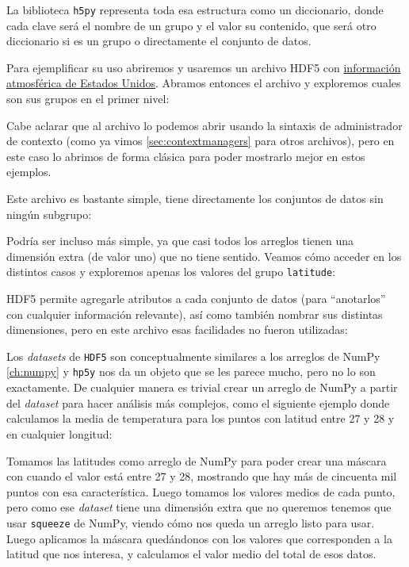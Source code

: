La biblioteca \texttt{h5py} representa toda esa estructura como un diccionario, donde cada clave será el nombre de un grupo y el valor su contenido, que será otro diccionario si es un grupo o directamente el conjunto de datos.

Para ejemplificar su uso abriremos y usaremos un archivo HDF5 con \href{https://data.nrel.gov/submissions/70}{información atmosférica de Estados Unidos}. Abramos entonces el archivo y exploremos cuales son sus grupos en el primer nivel:


Cabe aclarar que al archivo lo podemos abrir usando la sintaxis de administrador de contexto (como ya vimos \ref{sec:contextmanagers} para otros archivos), pero en este caso lo abrimos de forma clásica para poder mostrarlo mejor en estos ejemplos.

Este archivo es bastante simple, tiene directamente los conjuntos de datos sin ningún subgrupo:


Podría ser incluso más simple, ya que casi todos los arreglos tienen una dimensión extra (de valor uno) que no tiene sentido. Veamos cómo acceder en los distintos casos y exploremos apenas los valores del grupo \texttt{latitude}:


HDF5 permite agregarle atributos a cada conjunto de datos (para ``anotarlos'' con cualquier información relevante), así como también nombrar sus distintas dimensiones, pero en este archivo esas facilidades no fueron utilizadas:


Los \textit{datasets} de \texttt{HDF5} son conceptualmente similares a los arreglos de NumPy \ref{ch:numpy} y \texttt{hp5y} nos da un objeto que se les parece mucho, pero no lo son exactamente. De cualquier manera es trivial crear un arreglo de NumPy a partir del \textit{dataset} para hacer análisis más complejos, como el siguiente ejemplo donde calculamos la media de temperatura para los puntos con latitud entre 27 y 28 y en cualquier longitud:


Tomamos las latitudes como arreglo de NumPy para poder crear una máscara con  cuando el valor está entre 27 y 28, mostrando que hay más de cincuenta mil puntos con esa característica. Luego tomamos los valores medios de cada punto, pero como ese \textit{dataset} tiene una dimensión extra que no queremos tenemos que usar \texttt{squeeze} de NumPy, viendo cómo nos queda un arreglo listo para usar. Luego aplicamos la máscara quedándonos con los valores que corresponden a la latitud que nos interesa, y calculamos el valor medio del total de esos datos.


